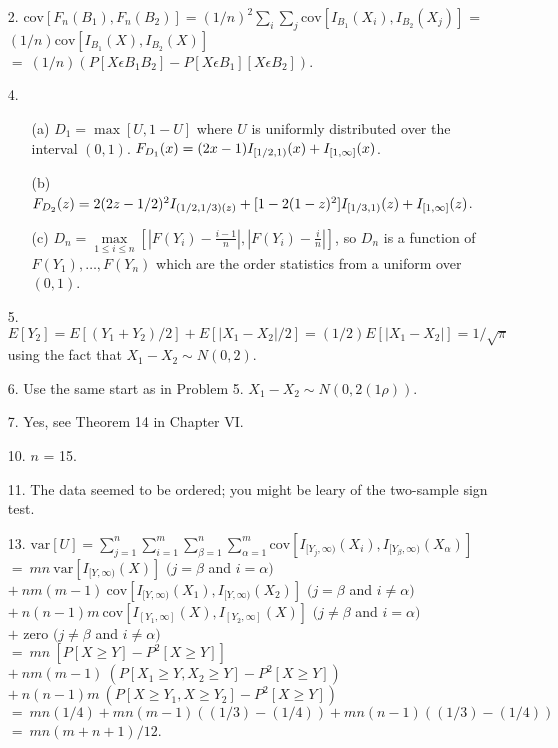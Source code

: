 \begin{enumerate}
	\item[2.]  $\mbox{cov}[F_n(B_1),F_n(B_2)] = (1/n)^2\sum\limits_{i}\sum\limits_{j}\mbox{cov}[I_{B_1}(X_i), I_{B_2}(X_j)]$ = $(1/n)\mbox{cov}[I_{B_1}(X), I_{B_2}(X)]$ \\ $=\ (1/n)(P[X\epsilon B_1B_2] - P[X\epsilon B_1][X\epsilon B_2])$.
	
	\item[4.] \begin{enumerate}
		\item[(a)] $D_1 = \max[U, 1-U]$ where $U$ is uniformly distributed over the interval $(0,1)$. $F_{D_1}(x) = (2x-1)I_{[{\small 1/2},1)}(x) + I_{[1,\infty]}(x)$.
		\item[(b)] $F_{D_2}(z) = 2(2z-{\small 1/2})^2I_{({\small 1/2,1/3})(z)} + [1-2(1-z)^2]I_{[{\small 1/3, 1})}(z) + I_{[1,\infty]}(z)$.
		\item[(c)] $D_n = \max\limits_{1\le i\le n} [\left\vert F(Y_i) - \frac{i-1}{n}\right\vert, \left\vert F(Y_i) - \frac{i}{n}\right\vert]$, so $D_n$ is a function of $F(Y_1), \ldots, F(Y_n)$ which are the order statistics from a uniform over $(0,1)$.
	\end{enumerate}
	
	\item[5.] $E[Y_2] = E[(Y_1+Y_2)/2] + E[\left\vert X_1-X_2\right\vert/2] = (1/2)E[\left\vert X_1-X_2\right\vert] = 1/\sqrt{\pi}$ using the fact that $X_1-X_2\sim N(0,2)$.
	
	\item[6.] Use the same start as in Problem 5.  $X_1-X_2 \sim N(0,2(1\rho))$.
	
	\item[7.] Yes, see Theorem 14 in Chapter VI.
	
	\item[10.] $n$ = 15.
	
	\item[11.] The data seemed to be ordered; you might be leary of the two-sample sign test.
	
	\item[13.] $\mbox{var}[U] = \sum\limits_{j=1}^n\sum\limits_{i=1}^m\sum\limits_{\beta=1}^n\sum\limits_{\alpha=1}^m\mbox{cov}[I_{[Y_j,\infty)}(X_i), I_{[Y_\beta,\infty)}(X_\alpha)]$ \\
	$=\ mn\ \mbox{var}[I_{[Y,\infty)}(X)]$ \hfill $(j = \beta$ and $i = \alpha)$ \\
	$+\ nm(m-1)\ \mbox{cov}[I_{[Y,\infty)}(X_1), I_{[Y,\infty)}(X_2)]$ \hfill $(j = \beta$ and $i \neq \alpha)$ \\
	$+\ n(n-1)m\ \mbox{cov}[I_{[Y_1,\infty]}(X), I_{[Y_2,\infty]}(X)]$ \hfill $(j \neq \beta$ and $i = \alpha)$ \\
	$+$ zero \hfill \hfill $(j \neq \beta$ and $i \neq \alpha)$ \\
	$=\ mn\ [P[X\ge Y] - P^2[X\ge Y]]$ \\
	$+\  nm(m-1)\ (P[X_1\ge Y, X_2\ge Y] - P^2[X\ge Y])$ \\
	$+\  n(n-1)m\ (P[X\ge Y_1, X\ge Y_2] - P^2[X\ge Y])$ \\
	$=\ mn(1/4) + mn(m-1)((1/3)-(1/4)) + mn(n-1)((1/3)-(1/4))$ \\
	$=\ mn(m+n+1)/12$.
	

\end{enumerate}
